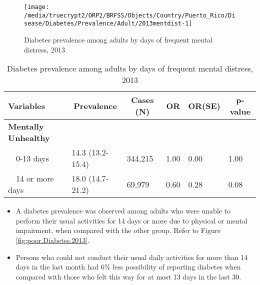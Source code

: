\begin{figure}[H]
\centering
\caption{Diabetes prevalence among adults by days of frequent mental distress, 2013}
\label{fig:mental.Diabetes.2013}

\begin{knitrout}
\color{fgcolor}

{\centering \texttt{[image: /media/truecrypt2/ORP2/BRFSS/Objects/Country/Puerto\_Rico/Disease/Diabetes/Prevalence/Adult/2013mentdist-1]} 

}



\end{knitrout}
 \end{figure}

\begin{table}[H]
\caption{Diabetes prevalence among adults by days of frequent mental distress, 2013\label{tab:mental.Diabetes.2013}} 
\begin{center}
\begin{tabular}{llllll}
\hline\hline
\multicolumn{1}{l}{Variables}&\multicolumn{1}{c}{Prevalence}&\multicolumn{1}{c}{Cases (N)}&\multicolumn{1}{c}{OR}&\multicolumn{1}{c}{OR(SE)}&\multicolumn{1}{c}{p-value}\tabularnewline
\hline
{\bfseries Mentally Unhealthy}&&&&&\tabularnewline
~~0-13 days&14.3 (13.2-15.4)&344,215&1.00&0.00&1.00\tabularnewline
~~14 or more days&18.0 (14.7-21.2)& 69,979&0.60&0.28&0.08\tabularnewline
\hline
\end{tabular}\end{center}

\end{table}



 \newpage
\begin{itemize}

\item A  
diabetes prevalence was observed among adults who were unable to perform their usual activities for 14 days or more due to physical or mental impairment, when compared with the other group. Refer to Figure \ref{fig:poor.Diabetes.2013}.



\item Persons who could not conduct their usual daily activities for more than 14 days in the last month had 6\% less possibility of reporting diabetes when compared with those who felt this way for at most 13 days in the last 30.

\end{itemize}


